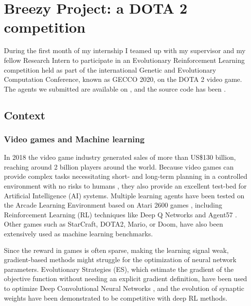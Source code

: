 \chapter{Breezy Project: a DOTA 2 competition}
\label{chap:dota}

During the first month of my internship I teamed up with my supervisor  and my fellow Research Intern  to participate in an Evolutionary Reinforcement Learning competition held as part of the international Genetic and Evolutionary Computation Conference, known as GECCO 2020, on the DOTA 2 video game. \\
The agents we submitted are available on , and the source code has been .

\section{Context}
\subsection{Video games and Machine learning}
In 2018 the video game industry generated sales of more than US\$130 billion, reaching around 2 billion players around the world. Because video games can provide complex tasks necessitating short- and long-term planning in a controlled environment with no risks to humans \cite{Games_AI}, they also provide an excellent test-bed for Artificial Intelligence (AI) systems. Multiple learning agents have been tested on the Arcade Learning Environment based on Atari 2600 games \cite{Atari}, including Reinforcement Learning (RL) techniques like Deep Q Networks \cite{DQN} and Agent57 \cite{agent57}. Other games such as StarCraft, DOTA2, Mario, or Doom, have also been extensively used as machine learning benchmarks.

Since the reward in games is often sparse, making the learning signal weak, gradient-based methods might struggle for the optimization of neural network parameters. Evolutionary Strategies (ES), which estimate the gradient of the objective function without needing an explicit gradient definition, have been used to optimize Deep Convolutional Neural Networks \cite{CMAES_DL}, and the evolution of synaptic weights have been demonstrated to be competitive with deep RL methods\cite{deep_neuroevo}.\\

